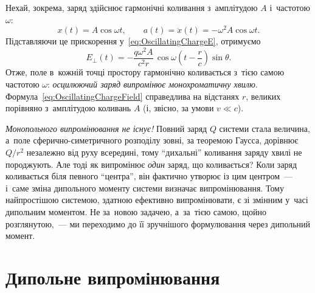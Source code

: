 Нехай, зокрема, заряд здійснює гармонічні коливання з~амплітудою $A$ і~частотою $\omega$:
\begin{equation*}
	x(t) = A\cos\omega t, \qquad a(t) = \ddot x(t) = -\omega^2 A\cos\omega t.
\end{equation*}
Підставляючи це прискорення у~\eqref{eq:OscillatingChargeE}, отримуємо
\begin{equation}\label{eq:OscillatingChargeField}
	E_\perp(t) = -\frac{q\omega^2 A}{c^2
	r}\,\cos\omega\!\left(t-\frac{r}{c}\right)\sin\theta.
\end{equation}
Отже, поле в~кожній точці простору гармонічно коливається з~тією самою частотою $\omega$:
\emph{осцилюючий заряд випромінює монохроматичну хвилю}.
Формула~\eqref{eq:OscillatingChargeField} справедлива на відстанях $r$, великих порівняно
з~амплітудою коливань $A$ (і, звісно, за умови $v\ll c$).

\begin{Attention}[unbreakable]
	\emph{Монопольного випромінювання не існує!} Повний заряд $Q$ системи стала величина,
	а~поле сферично-симетричного розподілу зовні, за теоремою Гаусса, дорівнює $Q/r^2$
	незалежно від руху всередині, тому \enquote{дихальні} коливання заряду хвилі не породжують.
	Але тоді як випромінює \emph{один} заряд, що коливається?
	Коли заряд коливається біля певного \enquote{центра}, він фактично утворює
	 із цим центром~--- і~саме зміна дипольного моменту системи
	визначає випромінювання. Тому найпростішою системою, здатною ефективно випромінювати, є
	 зі змінним у~часі дипольним моментом. Не за~новою
	задачею, а~за~тією самою, щойно розглянутою,~--- ми переходимо до її
	зручнішого формулювання через дипольний момент.
\end{Attention}



\section{Дипольне випромінювання}\hypertarget{dipole-radiation}{}



